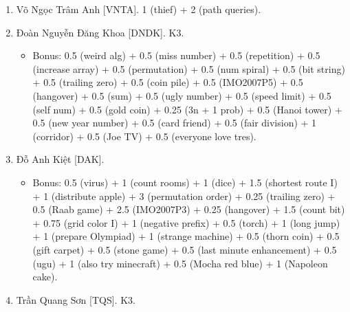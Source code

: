 \documentclass{article}
\begin{document}
\begin{enumerate}
	\item {\sc Võ Ngọc Trâm Anh [VNTA].} 1 (thief) + 2 (path queries).
    \item {\sc Đoàn Nguyễn Đăng Khoa [DNDK].} K3.
    \begin{itemize}
        \item Bonus: 0.5 (weird alg) + 0.5 (miss number) + 0.5 (repetition) + 0.5 (increase array) + 0.5 (permutation) + 0.5 (num spiral) + 0.5 (bit string) + 0.5 (trailing zero) + 0.5 (coin pile) + 0.5 (IMO2007P5) + 0.5 (hangover) + 0.5 (sum) + 0.5 (ugly number) + 0.5 (speed limit) + 0.5 (self num) + 0.5 (gold coin) + 0.25 (3n + 1 prob) + 0.5 (Hanoi tower) + 0.5 (new year number) + 0.5 (card friend) + 0.5 (fair division) + 1 (corridor) + 0.5 (Joe TV) + 0.5 (everyone love tres).
    \end{itemize}
	\item {\sc Đỗ Anh Kiệt [DAK].}
	\begin{itemize}
		\item Bonus: 0.5 (virus) + 1 (count rooms) + 1 (dice) + 1.5 (shortest route I)  + 1 (distribute apple) + 3 (permutation order) + 0.25 (trailing zero) + 0.5 (Raab game) + 2.5 (IMO2007P3) + 0.25 (hangover) + 1.5 (count bit) + 0.75 (grid color I) + 1 (negative prefix) + 0.5 (torch) + 1 (long jump) + 1 (prepare Olympiad) + 1 (strange machine) + 0.5 (thorn coin) + 0.5 (gift carpet) + 0.5 (stone game) + 0.5 (last minute enhancement) + 0.5 (ugu) + 1 (also try minecraft) + 0.5 (Mocha red blue) + 1 (Napoleon cake).
	\end{itemize}
	\item {\sc Trần Quang Sơn [TQS].} K3.
	\begin{itemize}

\end{itemize}
\end{enumerate}
\end{document}
